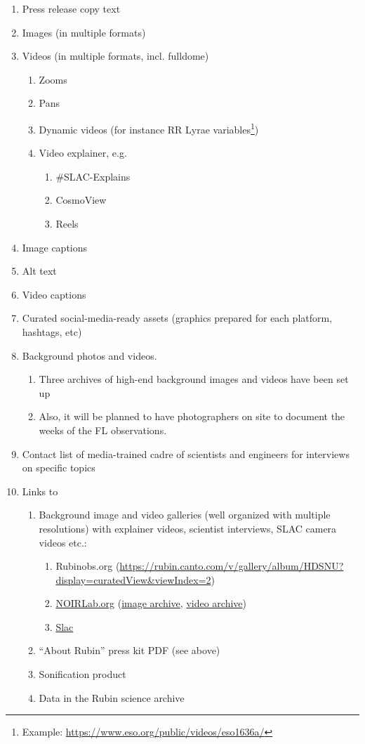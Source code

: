 \begin{enumerate}
\item Press release copy text
\item Images (in multiple formats)
\item Videos (in multiple formats, incl. fulldome)
\begin{enumerate}
\item Zooms
\item Pans
\item Dynamic videos (for instance RR Lyrae variables\footnote{Example: \url{https://www.eso.org/public/videos/eso1636a/}})
\item Video explainer, e.g.
\begin{enumerate}
\item \#SLAC-Explains
\item CosmoView
\item Reels
\end{enumerate}
\end{enumerate}
\item Image captions
\item Alt text
\item Video captions
\item Curated social-media-ready assets (graphics prepared for each platform, hashtags, etc)
\item Background photos and videos.
\begin{enumerate}
\item Three archives of high-end background images and videos have been set up
\item Also, it will be planned to have photographers on site to document the weeks of the FL observations.
\end{enumerate}
\item Contact list of media-trained cadre of scientists and engineers for interviews on specific topics
\item Links to
\begin{enumerate}
\item Background image and video galleries (well organized with multiple resolutions) with explainer videos, scientist interviews, SLAC camera videos etc.:
\begin{enumerate}
\item Rubinobs.org (\url{https://rubin.canto.com/v/gallery/album/HDSNU?display=curatedView&viewIndex=2})
\item \href{https://noirlab.edu/public/images/archive/category/rubin/}{NOIRLab.org} (\href{https://noirlab.edu/public/images/archive/category/rubin/}{image archive}, \href{https://noirlab.edu/public/videos/archive/category/rubin/}{video archive})
\item \href{http://NOIRLab.org}{Slac}
\end{enumerate}
\item “About Rubin” press kit PDF (see above)
\item Sonification product
\item Data in the Rubin science archive
\end{enumerate}
\end{enumerate}

